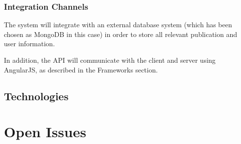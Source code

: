 \documentclass[a4paper,12pt]{article}
\begin{document}
\subsubsection{Integration Channels}
The system will integrate with an external database system (which has been chosen as MongoDB in this case) in order to store all relevant publication and user information.

In addition, the API will communicate with the client and server using AngularJS, as described in the Frameworks section.

\subsection{Technologies}

\newpage
\section{Open Issues}
\end{document}
